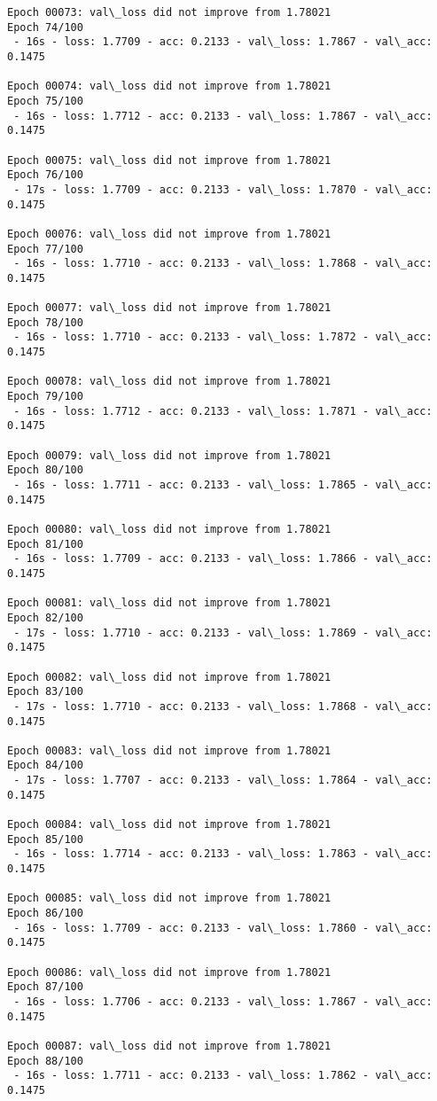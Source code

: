 \documentclass[11pt]{article}
\begin{document}
\begin{Verbatim}[commandchars=\\\{\}]
Epoch 00073: val\_loss did not improve from 1.78021
Epoch 74/100
 - 16s - loss: 1.7709 - acc: 0.2133 - val\_loss: 1.7867 - val\_acc: 0.1475

Epoch 00074: val\_loss did not improve from 1.78021
Epoch 75/100
 - 16s - loss: 1.7712 - acc: 0.2133 - val\_loss: 1.7867 - val\_acc: 0.1475

Epoch 00075: val\_loss did not improve from 1.78021
Epoch 76/100
 - 17s - loss: 1.7709 - acc: 0.2133 - val\_loss: 1.7870 - val\_acc: 0.1475

Epoch 00076: val\_loss did not improve from 1.78021
Epoch 77/100
 - 16s - loss: 1.7710 - acc: 0.2133 - val\_loss: 1.7868 - val\_acc: 0.1475

Epoch 00077: val\_loss did not improve from 1.78021
Epoch 78/100
 - 16s - loss: 1.7710 - acc: 0.2133 - val\_loss: 1.7872 - val\_acc: 0.1475

Epoch 00078: val\_loss did not improve from 1.78021
Epoch 79/100
 - 16s - loss: 1.7712 - acc: 0.2133 - val\_loss: 1.7871 - val\_acc: 0.1475

Epoch 00079: val\_loss did not improve from 1.78021
Epoch 80/100
 - 16s - loss: 1.7711 - acc: 0.2133 - val\_loss: 1.7865 - val\_acc: 0.1475

Epoch 00080: val\_loss did not improve from 1.78021
Epoch 81/100
 - 16s - loss: 1.7709 - acc: 0.2133 - val\_loss: 1.7866 - val\_acc: 0.1475

Epoch 00081: val\_loss did not improve from 1.78021
Epoch 82/100
 - 17s - loss: 1.7710 - acc: 0.2133 - val\_loss: 1.7869 - val\_acc: 0.1475

Epoch 00082: val\_loss did not improve from 1.78021
Epoch 83/100
 - 17s - loss: 1.7710 - acc: 0.2133 - val\_loss: 1.7868 - val\_acc: 0.1475

Epoch 00083: val\_loss did not improve from 1.78021
Epoch 84/100
 - 17s - loss: 1.7707 - acc: 0.2133 - val\_loss: 1.7864 - val\_acc: 0.1475

Epoch 00084: val\_loss did not improve from 1.78021
Epoch 85/100
 - 16s - loss: 1.7714 - acc: 0.2133 - val\_loss: 1.7863 - val\_acc: 0.1475

Epoch 00085: val\_loss did not improve from 1.78021
Epoch 86/100
 - 16s - loss: 1.7709 - acc: 0.2133 - val\_loss: 1.7860 - val\_acc: 0.1475

Epoch 00086: val\_loss did not improve from 1.78021
Epoch 87/100
 - 16s - loss: 1.7706 - acc: 0.2133 - val\_loss: 1.7867 - val\_acc: 0.1475

Epoch 00087: val\_loss did not improve from 1.78021
Epoch 88/100
 - 16s - loss: 1.7711 - acc: 0.2133 - val\_loss: 1.7862 - val\_acc: 0.1475


\end{Verbatim}
\end{document}
